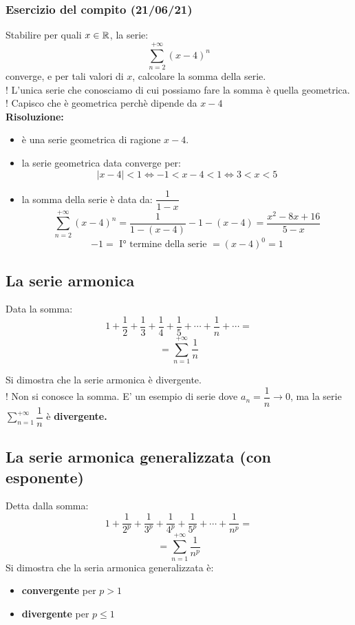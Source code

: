 \documentclass[../../main.tex]{subfiles}
\begin{document}
\subsubsection{Esercizio del compito (21/06/21)}
Stabilire per quali $x\in \mathbb{R}$, la serie:
\[
    \sum_{n=2}^{+\infty}(x-4)^n
\]
converge, e per tali valori di $x$, calcolare la somma della serie.\\ ! L'unica
serie che conosciamo di cui possiamo fare la somma è quella geometrica.\\ !
Capisco che è geometrica perchè dipende da $x-4$\\ \textbf{Risoluzione:}\\
\begin{itemize}
    \item è una serie geometrica di ragione $x-4$.
    \item la serie geometrica data converge per:
          \[
              |x-4|<1 \iff -1<x-4<1 \iff 3<x<5
          \]
    \item la somma della serie è data da: $\dfrac{1}{1-x}$
          \[
              \sum_{n=2}^{+\infty}(x-4)^n = \dfrac{1}{1-(x-4)} - 1 - (x-4) = \dfrac{x^2-8x+16}{5-x}
          \]
          \[
              -1 = \text{ I° termine della serie } = {(x-4)}^0 = 1
          \]
\end{itemize}

\subsection{La serie armonica}
Data la somma:
\[
    1+\dfrac{1}{2} + \dfrac{1}{3} + \dfrac{1}{4} + \dfrac{1}{5} + \cdots + \dfrac{1}{n} + \cdots = \]
\[
    = \sum_{n=1}^{+\infty} \dfrac{1}{n}\]

Si dimostra che la serie armonica è divergente.\\ ! Non si conosce la somma.
 E' un esempio di serie dove $a_n = \dfrac{1}{n} \to
    0$, ma la serie $\sum_{n=1}^{+\infty}\dfrac{1}{n}$ è \textbf{divergente.}

\subsection{La serie armonica generalizzata (con esponente)}
Detta dalla somma:
\[
    1+\dfrac{1}{2^p} + \dfrac{1}{3^p} + \dfrac{1}{4^p} + \dfrac{1}{5^p} + \cdots + \dfrac{1}{n^p} = \]
\[
    = \sum_{n=1}^{+\infty} \dfrac{1}{n^p}\]
Si dimostra che la seria armonica generalizzata è:
\begin{itemize}
    \item \textbf{convergente} per $p>1$
    \item \textbf{divergente} per $p\leq 1$
\end{itemize}
\end{document}
